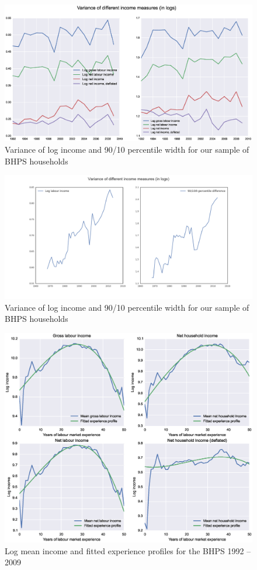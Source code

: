 \begin{figure}
\includegraphics[width=\columnwidth]{BHPS_incvar}
\caption{Variance of log income and 90/10 percentile width for our sample of
BHPS households}
\label{fig:bhps_incvar}
\end{figure}

\begin{figure}
\includegraphics[width=\columnwidth]{PSID_incvar}
\caption{Variance of log income and 90/10 percentile width for our sample of
BHPS households}
\label{fig:psid_incvar}
\end{figure}

\begin{figure}
\includegraphics[width=\columnwidth]{BHPS_fitted_profiles}
\caption{Log mean income and fitted experience profiles for the BHPS 1992 
-- 2009}
\label{fig:bhps_profiles}
\end{figure}


